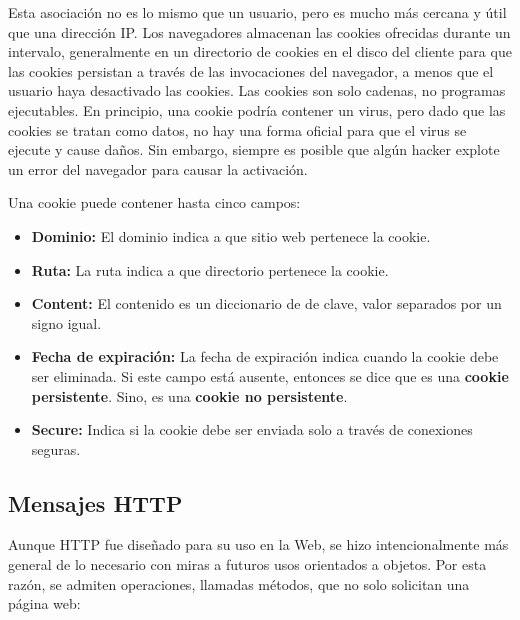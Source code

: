 Esta asociación no es lo mismo que un usuario, pero es mucho más cercana y útil que una dirección IP. Los navegadores almacenan las cookies ofrecidas durante un intervalo, generalmente en un directorio de cookies en el disco del cliente para que las cookies persistan a través de las invocaciones del navegador, a menos que el usuario haya desactivado las cookies. Las cookies son solo cadenas, no programas ejecutables. En principio, una cookie podría contener un virus, pero dado que las cookies se tratan como datos, no hay una forma oficial para que el virus se ejecute y cause daños. Sin embargo, siempre es posible que algún hacker explote un error del navegador para causar la activación.

Una cookie puede contener hasta cinco campos:
\begin{itemize}
  \item \textbf{Dominio:} El dominio indica a que sitio web pertenece la cookie.
  \item \textbf{Ruta:} La ruta indica a que directorio pertenece la cookie.
  \item \textbf{Content:} El contenido es un diccionario de de clave, valor separados por un signo igual.
  \item \textbf{Fecha de expiración:} La fecha de expiración indica cuando la cookie debe ser eliminada. Si este campo está ausente, entonces se dice que es una \textbf{cookie persistente}. Sino, es una \textbf{cookie no persistente}.
  \item \textbf{Secure:} Indica si la cookie debe ser enviada solo a través de conexiones seguras.
\end{itemize}

\subsection{Mensajes HTTP}

Aunque HTTP fue diseñado para su uso en la Web, se hizo intencionalmente más general de lo necesario con miras a futuros usos orientados a objetos. Por esta razón, se admiten operaciones, llamadas métodos, que no solo solicitan una página web:

